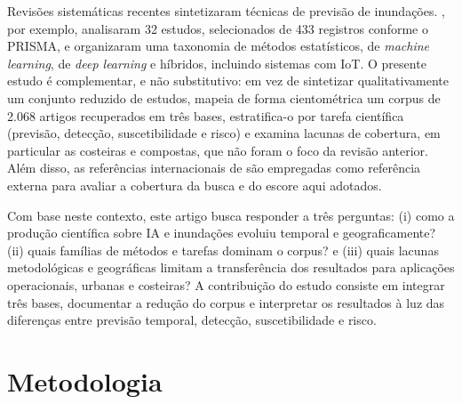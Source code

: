 

Revisões sistemáticas recentes sintetizaram técnicas de previsão de inundações. , por exemplo, analisaram 32 estudos, selecionados de 433 registros conforme o PRISMA, e organizaram uma taxonomia de métodos estatísticos, de \textit{machine learning}, de \textit{deep learning} e híbridos, incluindo sistemas com IoT. O presente estudo é complementar, e não substitutivo: em vez de sintetizar qualitativamente um conjunto reduzido de estudos, mapeia de forma cientométrica um corpus de 2.068 artigos recuperados em três bases, estratifica-o por tarefa científica (previsão, detecção, suscetibilidade e risco) e examina lacunas de cobertura, em particular as costeiras e compostas, que não foram o foco da revisão anterior. Além disso, as referências internacionais de  são empregadas como referência externa para avaliar a cobertura da busca e do escore aqui adotados.

Com base neste contexto, este artigo busca responder a três perguntas: (i) como a produção científica sobre IA e inundações evoluiu temporal e geograficamente? (ii) quais famílias de métodos e tarefas dominam o corpus? e (iii) quais lacunas metodológicas e geográficas limitam a transferência dos resultados para aplicações operacionais, urbanas e costeiras? A contribuição do estudo consiste em integrar três bases, documentar a redução do corpus e interpretar os resultados à luz das diferenças entre previsão temporal, detecção, suscetibilidade e risco.

\section{Metodologia}
\label{sec:art-metodologia}


